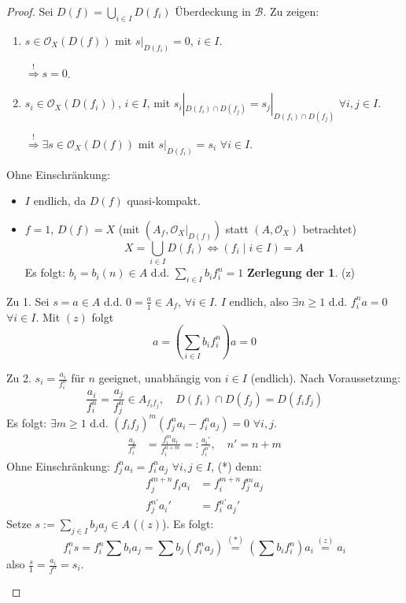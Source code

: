 \begin{proof}
  Sei $D(f)=\bigcup_{i\in I}D(f_{i})$ Überdeckung in $\mathcal{B}$.
  Zu zeigen:
  \begin{enumerate}
  \item $s\in\mathcal{O}_{X}(D(f))$ mit $s|_{D(f_{i})}=0$, $i\in I$.

    $\overset{!}{\Rightarrow}s=0$.
  \item $s_{i}\in\mathcal{O}_{X}(D(f_{i}))$, $i\in I$, mit $s_{i}|_{D(f_{i})\cap D(f_{j})}=s_{j}|_{D(f_{i})\cap D(f_{j})}$
    $\forall i,j\in I$.

    $\overset{!}{\Rightarrow}\exists s\in\mathcal{O}_{X}(D(f))$ mit $s|_{D(f_{i})}=s_{i}$
    $\forall i\in I$.
  \end{enumerate}
  Ohne Einschränkung:
  \begin{itemize}
  \item $I$ endlich, da $D(f)$ quasi-kompakt.
  \item $f=1$, $D(f)=X$ (mit $(A_{f},\mathcal{O}_{X}|_{D(f)})$ statt $(A,\mathcal{O}_{X})$
    betrachtet) 
    \[
    X=\bigcup_{i\in I}D(f_{i})\Leftrightarrow(f_{i}\mid i\in I)=A
    \]
    Es folgt: $b_{i}=b_{i}(n)\in A$ d.d. $\sum_{i\in I}b_{i}f_{i}^{n}=1$
    \textbf{Zerlegung der 1}. (z)
  \end{itemize}
  \begin{casenv}
  \item[Zu 1.] Sei $s=a\in A$ d.d. $0=\frac{a}{1}\in A_{f}$, $\forall i\in I$.
    $I$ endlich, also $\exists n\geq1$ d.d. $f_{i}^{n}a=0$ $\forall i\in I$.
    Mit $(z)$ folgt
    \[
    a=\left(\sum_{i\in I}b_{i}f_{i}^{n}\right)a=0
    \]
  \item[Zu 2.] $s_{i}=\frac{a_{i}}{f_{i}^{n}}$ für $n$ geeignet, unabhängig von
    $i\in I$ (endlich). Nach Voraussetzung:
    \[
    \frac{a_{i}}{f_{i}^{n}}=\frac{a_{j}}{f_{j}^{n}}\in A_{f_{i}f_{j}},\quad D(f_{i})\cap D(f_{j})=D(f_{i}f_{j})
    \]
    Es folgt: $\exists m\geq1$ d.d. $(f_{i}f_{j})^{m}(f_{j}^{n}a_{i}-f_{i}^{n}a_{j})=0$
    $\forall i,j$.
    \begin{align*}
      \frac{a_{i}}{f_{i}^{n}} & =\frac{f_{i}^{m}a_{i}}{f_{i}^{n+m}}=:\frac{a_{i}'}{f_{i}^{n'}},\quad n'=n+m
    \end{align*}
    Ohne Einschränkung: $f_{j}^{n}a_{i}=f_{i}^{n}a_{j}$ $\forall i,j\in I$,
    ({*}) denn:
    \begin{align*}
      f_{j}^{m+n}f_{i}a_{i} & =f_{i}^{m+n}f_{j}^{m}a_{j}\\
      f_{j}^{n'}a_{i}' & =f_{i}^{n'}a_{j}'
    \end{align*}
    Setze $s:=\sum_{j\in I}b_{j}a_{j}\in A$ ($(z)$). Es folgt:
    \[
    f_{i}^{n}s=f_{i}^{n}\sum b_{i}a_{j}=\sum b_{j}(f_{i}^{n}a_{j})\overset{(*)}{=}\left(\sum b_{i}f_{i}^{n}\right)a_{i}\overset{(z)}{=}a_{i}
    \]
    also $\frac{s}{1}=\frac{a_{i}}{f^{n}}=s_{i}$.
  \end{casenv}
\end{proof}
